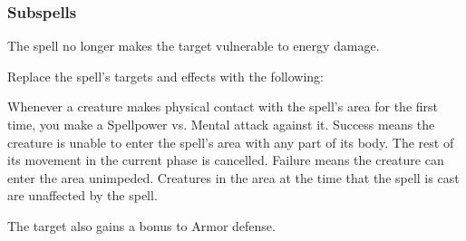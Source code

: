 \subsubsection{Subspells}



The spell no longer makes the target vulnerable to energy damage.









Replace the spell's targets and effects with the following:
\begin{spellcontent}

\begin{augmenttargetinginfo}



\end{augmenttargetinginfo}


\begin{augmenteffects}



\spelleffect
Whenever a creature makes physical contact with the spell's area for the first time, you make a Spellpower vs. Mental attack against it.
Success means the creature is unable to enter the spell's area with any part of its body.
The rest of its movement in the current phase is cancelled.
Failure means the creature can enter the area unimpeded.
Creatures in the area at the time that the spell is cast are unaffected by the spell.








\end{augmenteffects}

\end{spellcontent}






The target also gains a  bonus to Armor defense.









